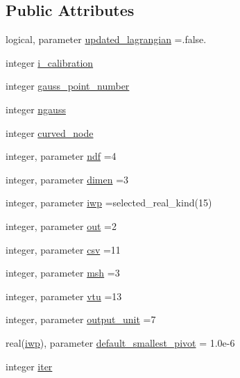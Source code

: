 \subsection*{Public Attributes}
\begin{DoxyCompactItemize}
\item 
logical, parameter \hyperlink{classlinearsolvers_a3beb4a2e461e3f23690b04384b5193db}{updated\+\_\+lagrangian} =.false.
\item 
integer \hyperlink{classlinearsolvers_ae3109655a0b2a3ce2f2f8055f36b42f5}{i\+\_\+calibration}
\item 
integer \hyperlink{classlinearsolvers_aa8d800b0797e3fcb1f1b356e1f50c72f}{gauss\+\_\+point\+\_\+number}
\item 
integer \hyperlink{classlinearsolvers_a8ced5281550d7cc415867f4ffad677cc}{ngauss}
\item 
integer \hyperlink{classlinearsolvers_ab6c5dcc0fd013301b8dba92399cf425e}{curved\+\_\+node}
\item 
integer, parameter \hyperlink{classlinearsolvers_a16b2c5243d044cf63c37c79198897da4}{ndf} =4
\item 
integer, parameter \hyperlink{classlinearsolvers_afc5c1c2544af5d4b0be295c5b9f3d524}{dimen} =3
\item 
integer, parameter \hyperlink{classlinearsolvers_ae428ee060e10bb0c2b1ce969c90536e1}{iwp} =selected\+\_\+real\+\_\+kind(15)
\item 
integer, parameter \hyperlink{classlinearsolvers_a5af0b90122d00e31c2ecaac4918dc001}{out} =2
\item 
integer, parameter \hyperlink{classlinearsolvers_a49a55d932e7021639b2202650625c73d}{csv} =11
\item 
integer, parameter \hyperlink{classlinearsolvers_a915e2590f13b0c2b952398e7f0d007e5}{msh} =3
\item 
integer, parameter \hyperlink{classlinearsolvers_a7088a307d979587da84eeee7ccd568a0}{vtu} =13
\item 
integer, parameter \hyperlink{classlinearsolvers_ac4dc5d7d05bef334ad9d56f0c80fe21d}{output\+\_\+unit} =7
\item 
real(\hyperlink{classlinearsolvers_ae428ee060e10bb0c2b1ce969c90536e1}{iwp}), parameter \hyperlink{classlinearsolvers_a1045ebc16c5962f7bfe6da3e58f1016b}{default\+\_\+smallest\+\_\+pivot} = 1.\+0e-\/6
\item 
integer \hyperlink{classlinearsolvers_a17c8c1e427b50ea49bc6c44b1799c08f}{iter}
\end{DoxyCompactItemize}


